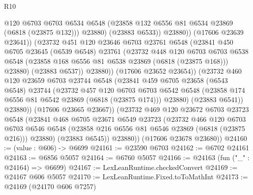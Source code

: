 \begin{lexlean}{R10}
\begin{coremodule}
                          @120
                          @6703
                          @6703
                          @6534
                          @6548
                          (@23858 @132 @6556 @81 @6534 @23869 (@6818 (@23875 @132)))
                          @23880)
                        (@23883 @6533))
                      @23880))
                  (@17606 @23639 @23641))
                (@23732
                  @451
                  @120
                  @23646
                  @6703
                  @23761
                  @6548
                  (@23841
                    @450
                    @6705
                    @23645
                    (@6539 @6548)
                    @23761
                    (@23732
                      @448
                      @120
                      @6703
                      @6703
                      @6538
                      @6548
                      (@23858 @168 @6556 @81 @6538 @23869 (@6818 (@23875 @168)))
                      @23880)
                    (@23883 @6537))
                  @23880))
              (@17606 @23652 @23654))
            (@23732
              @460
              @120
              @23659
              @6703
              @23744
              @6548
              (@23841
                @459
                @6705
                @23658
                (@6543 @6548)
                @23744
                (@23732
                  @457
                  @120
                  @6703
                  @6703
                  @6542
                  @6548
                  (@23858 @174 @6556 @81 @6542 @23869 (@6818 (@23875 @174)))
                  @23880)
                (@23883 @6541))
              @23880))
          (@17606 @23665 @23667))
        (@23732
          @469
          @120
          @23672
          @6703
          @23723
          @6548
          (@23841
            @468
            @6705
            @23671
            @6549
            @23723
            (@23732
              @466
              @120
              @6703
              @6703
              @6546
              @6548
              (@23858 @216 @6556 @81 @6546 @23869 (@6818 (@23875 @216)))
              @23880)
            (@23883 @6545))
          @23880))
      (@17606 @23678 @23680))
@24160 := (value : @606) -> @6699
@24161 := @23590 @6703
@24162 := @6702 @24161
@24163 := @6856 @5057
@24164 := @6760 @5057
@24166 := @24163 (fun ("_" : @24164) => @6699)
@24167 := LexLeanRuntime.checkedConvert
@24169 := @24167 @606 @5057
@24170 := LexLeanRuntime.Fixed.toToMathInt
@24173 := @24169 (@24170 @606 @7257)

\end{coremodule}
\end{lexlean}
